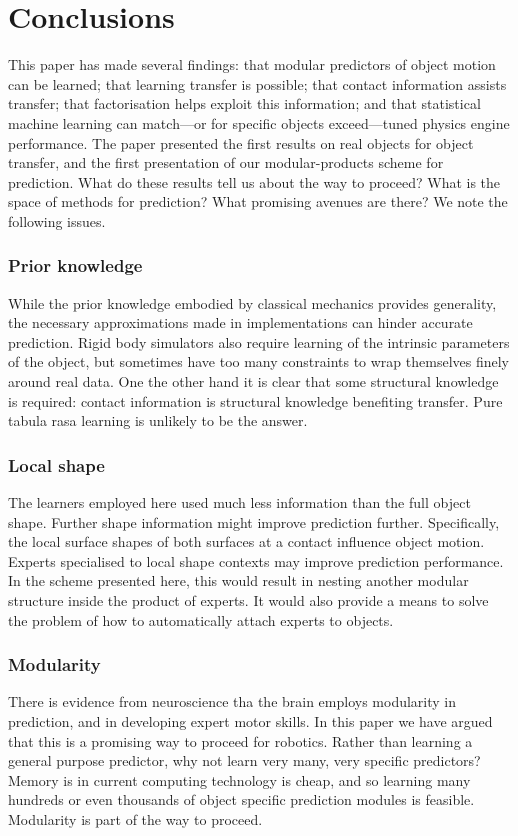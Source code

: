 
\section{Conclusions}\label{sec:Discussion}

This paper has made several findings: that modular predictors of object motion can be learned; that learning transfer is possible; that contact information assists transfer; that factorisation helps exploit this information; and that statistical machine learning can match---or for specific objects exceed---tuned physics engine performance. The paper presented the first results on real objects for object transfer, and the first presentation of our modular-products scheme for prediction. What do these results tell us about the way to proceed? What is the space of methods for prediction? What promising avenues are there? We note the following issues.

\subsubsection{ Prior knowledge} While the prior knowledge embodied by classical mechanics provides generality, the necessary approximations made in implementations can hinder accurate prediction. Rigid body simulators also require learning of the intrinsic parameters of the object, but sometimes have too many constraints to wrap themselves finely around real data. One the other hand it is clear that some structural knowledge is required: contact information is structural knowledge benefiting transfer. Pure tabula rasa learning is unlikely to be the answer.

\subsubsection{ Local shape} The learners employed here used much less information than the full object shape. Further shape information might improve prediction further. Specifically, the local surface shapes of both surfaces at a contact influence object motion. Experts specialised to local shape contexts may improve prediction performance. In the scheme presented here, this would result in nesting another modular structure inside the product of experts. It would also provide a means to solve the problem of how to automatically attach experts to objects.

\subsubsection{ Modularity} There is evidence from neuroscience tha the brain employs modularity in prediction, and in developing expert motor skills. In this paper we have argued that this is a promising way to proceed for robotics. Rather than learning a general purpose predictor, why not learn very many, very specific predictors? Memory is in current computing technology is cheap, and so learning many hundreds or even thousands of object specific prediction modules is feasible. Modularity is part of the way to proceed.

